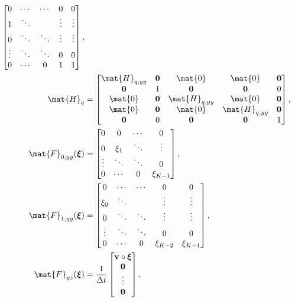 \documentclass{jpmarticle}
\renewcommand{\vec}[1]{\boldsymbol{\mathrm{#1}}}
\let\subequationsorig\subequations%
\let\endsubequationsorig\endsubequations%
\renewenvironment{subequations}{
  \subequationsorig
  \renewcommand{\theequation}{\theparentequation.\arabic{equation}}
}{
  \endsubequationsorig
}
\begin{document}
\begin{subequations}
\begin{align}
    \begin{bmatrix}
      0 & \cdots & \cdots & 0 & 0 \\
      1 & \ddots & & \vdots & \vdots \\
      0 & \ddots & \ddots & \vdots & \vdots \\
      \vdots & \ddots & \ddots & 0 & 0 \\
      0 & \cdots & 0 & 1 & 1
    \end{bmatrix},
    \\
    \mat{H}_{q} &=
    \begin{bmatrix}
      \mat{H}_{q, yy} & \vec{0} & \mat{0} & \mat{0} & \vec{0} \\
      \vec{0} & 1 & \vec{0} & \vec{0} & 0 \\
      \mat{0} & \vec{0} & \mat{H}_{q, yy} & \mat{0} & \vec{0} \\
      \mat{0} & \vec{0} & \mat{0} & \mat{H}_{q, yy} & \vec{0}
      \\
      \vec{0} & 0 & \vec{0} & \vec{0} & 1
    \end{bmatrix},
    \\
    \mat{F}_{0, yy}(\vec{\xi}) &=
    \begin{bmatrix}
      0 & 0 & \cdots & 0 \\
      0 & \xi_1 & \ddots & \vdots \\
      \vdots & \ddots & \ddots & 0 \\
      0 & \cdots & 0 & \xi_{K - 1}
    \end{bmatrix},
    \\
    \mat{F}_{1, yy}(\vec{\xi}) &=
    \begin{bmatrix}
      0 & \cdots & \cdots & 0 & 0 \\
      \xi_0 & \ddots & & \vdots & \vdots \\
      0 & \ddots & \ddots & \vdots & \vdots \\
      \vdots & \ddots & \ddots & 0 & 0 \\
      0 & \cdots & 0 & \xi_{K - 2} & \xi_{K - 1}
    \end{bmatrix},
    \\
    \mat{F}_{yz}(\vec{\xi}) &=
    \frac{1}{\Delta t}
    \begin{bmatrix}
      \vec{v} \circ \vec{\xi} \\
      \vec{0} \\
      \vdots \\
      \vec{0}
    \end{bmatrix},
    \\

\end{align}
\end{subequations}
\end{document}
